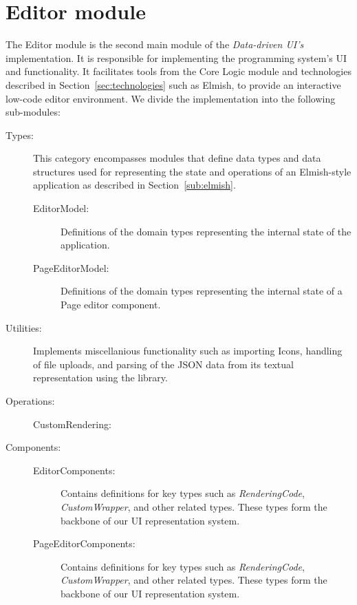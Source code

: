 \section{Editor module}
The Editor module is the second main module of the \emph{Data-driven UI's} implementation.
It is responsible for implementing the programming system's UI and functionality.
It facilitates tools from the Core Logic module and technologies described in Section~\ref{sec:technologies} such as Elmish, to provide an interactive low-code editor environment.
We divide the implementation into the following sub-modules:
\begin{description}
	\item[Types:] This category encompasses modules that define data types and data structures used for representing the state and operations of an Elmish-style application as described in Section~\ref{sub:elmish}.
	      \begin{description}
		      \item[EditorModel:] Definitions of the domain types representing the internal state of the application.
		      \item[PageEditorModel:] Definitions of the domain types representing the internal state of a Page editor component.
	      \end{description}

	\item[Utilities:] Implements miscellanious functionality such as importing Icons, handling of file uploads, and parsing of the JSON data from its textual representation using the \citet{simpleJson} library.
	\item[Operations:]
	      \begin{description}
		      \item[CustomRendering:]
	      \end{description}

	\item[Components:]
	      \begin{description}
		      \item[EditorComponents:] Contains definitions for key types such as \emph{RenderingCode}, \emph{CustomWrapper}, and other related types.
		            These types form the backbone of our UI representation system.
		      \item[PageEditorComponents:] Contains definitions for key types such as \emph{RenderingCode}, \emph{CustomWrapper}, and other related types.
		            These types form the backbone of our UI representation system.

	      \end{description}
\end{description}



